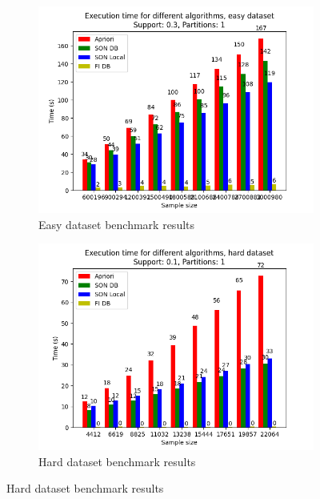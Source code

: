 \documentclass[a4paper]{article}
\begin{document}
	\begin{figure}[h]
		\centering
		\begin{subfigure}[b]{\textwidth}
			\centering
			\includegraphics[width=\textwidth]{1_easy_0,3_1_dataset.png}
         	\caption{Easy dataset benchmark results}
         	\label{fig:1-03sup-1par-ds-e}
		\end{subfigure}
		\hfill		
		\begin{subfigure}[b]{\textwidth}
			\centering
			\includegraphics[width=\textwidth]{1_hard_0,1_1_dataset.png}
         	\caption{Hard dataset benchmark results}
         	\label{fig:1-01sup-1par-ds-h}
		\end{subfigure}
		\hfill
		
	\end{figure}
	
\end{document}
